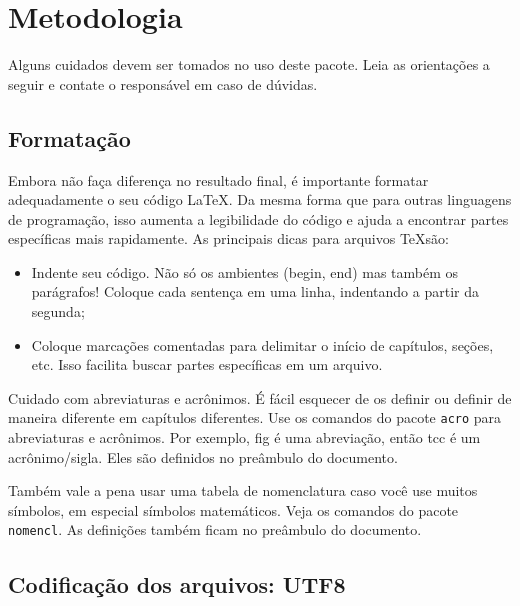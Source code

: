 \chapter{Metodologia}\label{desenvolvimento}

Alguns cuidados devem ser tomados no uso deste pacote.
  Leia as orientações a seguir e contate o responsável em caso de dúvidas.
  

\section{Formatação}

Embora não faça diferença no resultado final, é importante formatar adequadamente o seu código \LaTeX.
  Da mesma forma que para outras linguagens de programação, isso aumenta a legibilidade do código e ajuda a encontrar partes específicas mais rapidamente.
  As principais dicas para arquivos \TeX são:
 \begin{itemize}
   \item Indente seu código. Não só os ambientes (begin, end) mas também os parágrafos! Coloque cada sentença em uma linha, indentando a partir da segunda;
   \item Coloque marcações comentadas para delimitar o início de capítulos, seções, etc. Isso facilita buscar partes específicas em um arquivo.
 \end{itemize}
    
Cuidado com abreviaturas e acrônimos.
  É fácil esquecer de os definir ou definir de maneira diferente em capítulos diferentes.
  Use os comandos do pacote \texttt{acro} para abreviaturas e acrônimos.
  Por exemplo, \ac{fig} é uma abreviação, então \ac{tcc} é um acrônimo/sigla.
  Eles são definidos no preâmbulo do documento.
  
Também vale a pena usar uma tabela de nomenclatura caso você use muitos símbolos, em especial símbolos matemáticos.
  Veja os comandos do pacote \texttt{nomencl}.
  As definições também ficam no preâmbulo do documento.


\section{Codificação dos arquivos: UTF8}

